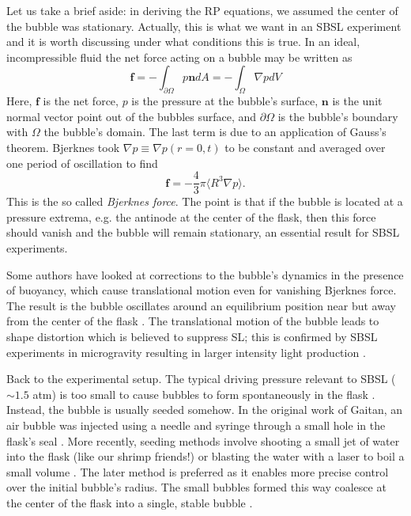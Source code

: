 \documentclass[rmp,aps,nofootinbib,superscriptaddress,floatfix]{revtex4-2}
\begin{document}
Let us take a brief aside: in deriving the RP equations, we assumed the center of the bubble was stationary. Actually, this is what we want in an SBSL experiment and it is worth discussing under what conditions this is true. In an ideal, incompressible fluid the net force acting on a bubble may be written as 
\begin{equation}
    \bm{f}=-\int_{\partial \Omega} p \bm{n} dA = -\int_\Omega \nabla p dV
\end{equation}
Here, $\bm{f}$ is the net force, $p$ is the pressure at the bubble's surface, $\bm{n}$ is the unit normal vector point out of the bubbles surface, and $\partial \Omega$ is the bubble's boundary with $\Omega$ the bubble's domain. The last term is due to an application of Gauss's theorem. Bjerknes \cite{bjerknes1909kraftfelder} took $\nabla p \equiv \nabla p(r=0,t)$ to be constant and averaged over one period of oscillation to find 
\begin{equation}
    \bm{f} = -\frac{4}{3}\pi \langle R^3 \nabla p \rangle.
    \label{eq:Bj_force}
\end{equation}
This is the so called \emph{Bjerknes force}. The point is that if the bubble is located at a pressure extrema, e.g. the antinode at the center of the flask, then this force should vanish and the bubble will remain stationary, an essential result for SBSL experiments.

Some authors have looked at corrections to the bubble's dynamics in the presence of buoyancy, which cause translational motion even for vanishing Bjerknes force. The result is the bubble oscillates around an equilibrium position near but away from the center of the flask \cite{matula2000single,matula1997bjerknes,matula1999inertial}. The translational motion of the bubble leads to shape distortion which is believed to suppress SL; this is confirmed by SBSL experiments in microgravity resulting in larger intensity light production \cite{matula2000single}.

Back to the experimental setup. The typical driving pressure relevant to SBSL ($\sim 1.5$ atm) is too small to cause bubbles to form spontaneously in the flask \cite{}. Instead, the bubble is usually seeded somehow. In the original work of Gaitan, an air bubble was injected using a needle and syringe through a small hole in the flask's seal \cite{gaitan1992sonoluminescence}. More recently, seeding methods involve shooting a small jet of water into the flask (like our shrimp friends!) or blasting the water with a laser to boil a small volume \cite{}. The later method is preferred as it enables more precise control over the initial bubble's radius. The small bubbles formed this way coalesce at the center of the flask into a single, stable bubble \cite{}.
\end{document}
